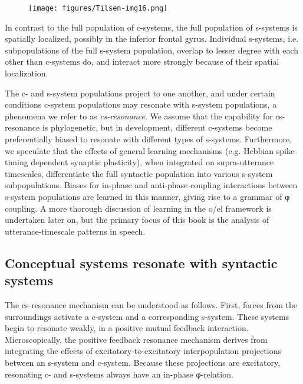   
\begin{figure}
\texttt{[image: figures/Tilsen-img16.png]}
\caption{\missingcaption}
\label{fig:2:9}
\end{figure}
 

  In contrast to the full population of c-systems, the full population of s-systems is spatially localized, possibly in the inferior frontal gyrus. Individual s-systems, i.e. subpopulations of the full s-system population, overlap to lesser degree with each other than c-systems do, and interact more strongly because of their spatial localization. 

  The c- and s-system populations project to one another, and under certain conditions c-system populations may resonate with s-system populations, a phenomena we refer to as \textit{cs-resonance}. We assume that the capability for cs-resonance is phylogenetic, but in development, different c-systems become preferentially biased to resonate with different types of s-systems. Furthermore, we speculate that the effects of general learning mechanisms (e.g. Hebbian spike-timing dependent synaptic plasticity), when integrated on supra-utterance timescales, differentiate the full syntactic population into various s-system subpopulations. Biases for in-phase and anti-phase coupling interactions between s-system populations are learned in this manner, giving rise to a grammar of φ coupling. A more thorough discussion of learning in the o/el framework is undertaken later on, but the primary focus of this book is the analysis of utterance-timescale patterns in speech.

\subsection{Conceptual systems resonate with syntactic systems}

The cs-resonance mechanism can be understood as follows. First, forces from the surroundings activate a c-system and a corresponding s-system. These systems begin to resonate weakly, in a positive mutual feedback interaction. Microscopically, the positive feedback resonance mechanism derives from integrating the effects of excitatory-to-excitatory interpopulation projections between an s-system and c-system. Because these projections are excitatory, resonating c- and s-systems always have an in-phase φ-relation. 

